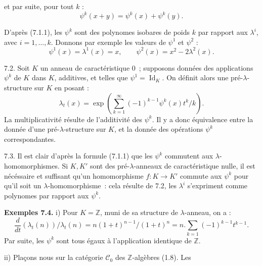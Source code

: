 
et par
suite, pour tout \(k\) :
\[
  \psi^k(x+y)=\psi^k(x)+\psi^k(y).
\]

D'après (7.1.1), les \(\psi^k\) sont des polynomes isobares de poids \(k\) par rapport aux \(\lambda^i\), avec \(i=1,\ldots,k\). Donnons par exemple les valeurs de \(\psi^1\) et \(\psi^2\) :
\[
  \psi^1(x)=\lambda^1(x)=x,
  \qquad
  \psi^2(x)=x^2-2\lambda^2(x).
\]

7.2. Soit \(K\) un anneau de caractéristique \(0\)~; supposons données des applications \(\psi^k\) de \(K\) dans \(K\), additives, et telles que \(\psi^1=\operatorname{Id}_K\). On définit alors une pré-\(\lambda\)-structure sur \(K\) en posant :
\begin{equation}\tag{7.2.1}
  \lambda_t(x)=
  \exp\left(\sum_{k=1}^{\infty}(-1)^{k-1}\psi^k(x)t^k/k\right).
\end{equation}
La multiplicativité résulte de l'additivité des \(\psi^k\). Il y a donc équivalence entre la donnée d'une pré-\(\lambda\)-structure sur \(K\), et la donnée des opérations \(\psi^k\) correspondantes.

7.3. Il est clair d'après la formule (7.1.1) que les \(\psi^k\) commutent aux \(\lambda\)-homomorphismes. Si \(K,K'\) sont des pré-\(\lambda\)-anneaux de caractéristique nulle, il est nécéssaire et suffisant qu'un homomorphisme \(f:K\to K'\) commute aux \(\psi^k\) pour qu'il soit un \(\lambda\)-homomorphisme~: cela résulte de 7.2, les \(\lambda^i\) s'expriment comme polynomes par rapport aux \(\psi^k\).

\textbf{Exemples 7.4.} i) Pour \(K=\mathbb Z\), muni de sa structure de \(\lambda\)-anneau, on a :
\[
  \frac{d}{dt}(\lambda_t(n))/\lambda_t(n)
  =
  n(1+t)^{n-1}/(1+t)^n
  =
  n.\sum_{k=1}(-1)^{k-1}t^{k-1}.
\]
Par suite, les \(\psi^k\) sont tous égaux à l'application identique de \(\mathbb Z\).

ii) Plaçons nous sur la catégorie \(\mathcal C_0\) des \(\mathbb Z\)-algèbres (1.8). Les 
